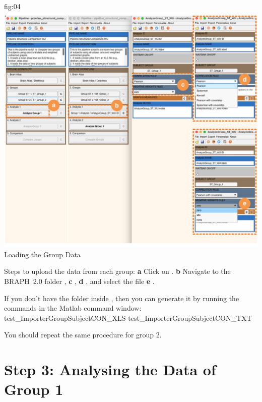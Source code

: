 \documentclass[justified]{tufte-handout}
\begin{document}
{{	
	{fig:04}
	{
	\includegraphics{fig04.jpg}
	}
	{Loading the Group Data}
	{
	Steps to upload the data from each group:
	{\bf a} Click on .
	{\bf b} Navigate to the BRAPH~2.0 folder , {\bf c} , {\bf d} , and select the file {\bf e} .

If you don't have the  folder inside , then you can generate it by running the commands in the Matlab command window:
test_ImporterGroupSubjectCON_XLS  %
test_ImporterGroupSubjectCON_TXT  %

You should repeat the same procedure for group 2.

\section{Step 3: Analysing the Data of Group 1}

}}}
\end{document}
